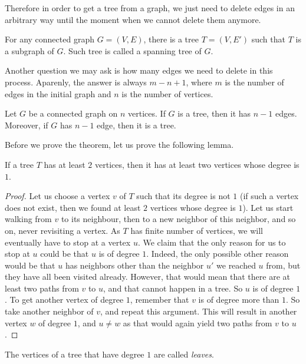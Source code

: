 Therefore in order to get a tree from a graph, we just need to delete edges
in an arbitrary way until the moment when we cannot delete them anymore.
\begin{corollary}
  For any connected graph $G = (V, E)$, there is a tree $T = (V, E')$ such
  that $T$ is a subgraph of $G$. Such tree is called a spanning tree of $G$.
\end{corollary}

Another question we may ask is how many edges we need to delete in this process.
Aparenly, the answer is always $m - n + 1$, where $m$ is the number of edges in
the initial graph and $n$ is the number of vertices.
\begin{theorem}
\label{theorem:tree-is-minimally-connected}
  Let $G$ be a connected graph on $n$ vertices.
  If $G$ is a tree, then it has $n - 1$ edges. Moreover, if $G$ has $n - 1$
  edge, then it is a tree.
\end{theorem}

Before we prove the theorem, let us prove the following lemma.
\begin{lemma}
  If a tree $T$ has at least $2$ vertices, then it has at least two
  vertices whose degree is $1$.
\end{lemma}
\begin{proof}
  Let us choose a vertex $v$ of $T$ such that its degree is not $1$ (if such a
  vertex does not exist, then we found at least $2$ vertices whose degree is
  $1$). Let us start walking from $v$ to its neighbour, then to a new neighbor
  of this neighbor, and so on, never revisiting a vertex. As $T$ has finite
  number of vertices, we will eventually have to stop at a vertex $u$. We claim
  that the only reason for us to stop at $u$ could be that $u$ is of degree $1$.
  Indeed, the only possible other reason would be that $u$ has neighbors other
  than the neighbor $u'$ we reached $u$ from, but they have all been visited
  already. However, that would mean that there are at least two paths from $v$
  to $u$, and that cannot happen in a tree. So $u$ is of degree $1$. To get
  another vertex of degree $1$, remember that $v$ is of degree more than $1$.
  So take another neighbor of $v$, and repeat this argument. This will result in
  another vertex $w$ of degree $1$, and $u \neq w$ as that would again yield two
  paths from $v$ to $u$.
\end{proof}
The vertices of a tree that have degree $1$ are called \emph{leaves}.

